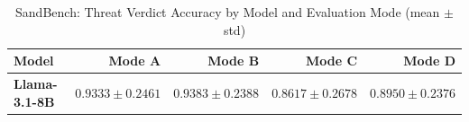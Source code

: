 \begin{table}[ht]
\centering
\caption{SandBench: Threat Verdict Accuracy by Model and Evaluation Mode (mean $\pm$ std)}
\label{tab:verdict_accuracy}
\begin{tabular}{lrrrr}
\toprule
Model & Mode A & Mode B & Mode C & Mode D \\
\midrule
\textbf{Llama-3.1-8B} & $0.9333 \pm 0.2461$ & $0.9383 \pm 0.2388$ & $0.8617 \pm 0.2678$ & $0.8950 \pm 0.2376$ \\
\bottomrule
\end{tabular}
\end{table}